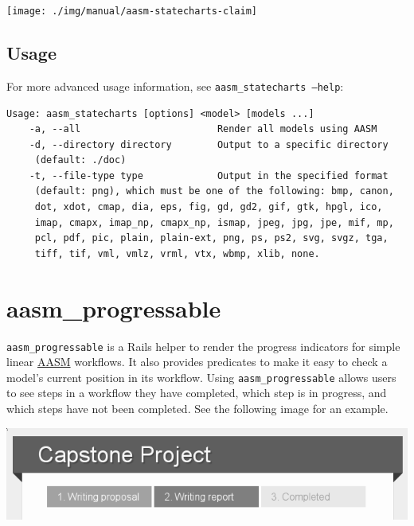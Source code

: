 \documentclass[document.tex]{subfiles}
\begin{document}
\vspace{5mm}

\begin{center}
 \texttt{[image: ./img/manual/aasm-statecharts-claim]}
\end{center}


\subsection{Usage}

For more advanced usage information, see {\tt aasm\_statecharts --help}:

\begin{verbatim}Usage: aasm_statecharts [options] <model> [models ...]
    -a, --all                        Render all models using AASM
    -d, --directory directory        Output to a specific directory
     (default: ./doc)
    -t, --file-type type             Output in the specified format
     (default: png), which must be one of the following: bmp, canon,
     dot, xdot, cmap, dia, eps, fig, gd, gd2, gif, gtk, hpgl, ico,
     imap, cmapx, imap_np, cmapx_np, ismap, jpeg, jpg, jpe, mif, mp,
     pcl, pdf, pic, plain, plain-ext, png, ps, ps2, svg, svgz, tga,
     tiff, tif, vml, vmlz, vrml, vtx, wbmp, xlib, none.
\end{verbatim}




\section{aasm\_progressable}

{\tt aasm\_progressable} is a Rails helper to render the progress indicators for simple linear \href{https://github.com/aasm/aasm}{AASM} workflows. It also provides predicates to make it easy to check a model's current position in its workflow. Using {\tt aasm\_progressable} allows users to see steps in a workflow they have completed, which step is in progress, and which steps have not been completed. See the following image for an example.

\vspace{5mm}

\begin{center}
 \includegraphics[width=6.0in]{./img/manual/aasm-progressable-example}
\end{center}
\end{document}
